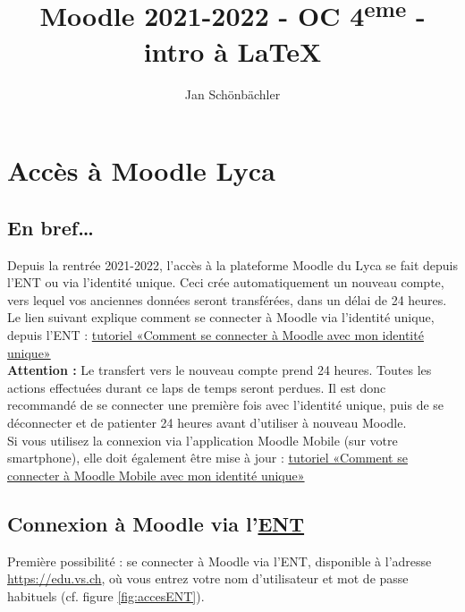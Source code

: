 \documentclass[10pt,a4paper]{report}
\author{Jan Schönbächler}
\title{Moodle 2021-2022 - OC 4\textsuperscript{eme} - intro à \LaTeX}
\begin{document}
	
	
	\parindent=0cm
	
	\chapter{Accès à Moodle Lyca}
	
	\section*{En bref\dots}
	
	Depuis la rentrée 2021-2022, l'accès à la plateforme Moodle du Lyca se fait depuis l'ENT ou via l'identité unique. Ceci crée automatiquement un nouveau compte, vers lequel vos anciennes données seront transférées, dans un délai de 24 heures.\\
	
	
	Le lien suivant explique comment se connecter à Moodle via l'identité unique, depuis l'ENT : \href{https://support.ictvs.ch/media/attachments/2021/07/20/tutoriel\_moodle\_win-fr\_2-acces-identite-unique.pdf}{tutoriel «Comment se connecter à Moodle avec mon identité unique»}\\
	
	
	\textbf{Attention :} Le transfert vers le nouveau compte prend 24 heures. Toutes les actions effectuées durant ce laps de temps seront perdues. Il est donc recommandé de se connecter une première fois avec l'identité unique, puis de se déconnecter et de patienter 24 heures avant d’utiliser à nouveau Moodle.\\
	
	Si vous utilisez la connexion via l’application Moodle Mobile (sur votre smartphone), elle doit également être mise à jour : \href{https://support.ictvs.ch/media/attachments/2021/07/22/tutoriel\_moodle\_android-fr\_2-acces-identite-unique-mobile.pdf}{tutoriel «Comment se connecter à Moodle Mobile avec mon identité unique»}
	
	
	\section{Connexion à Moodle via l'\href{https://edu.vs.ch}{ENT}}
	
	
	Première possibilité : se connecter à Moodle via l'ENT, disponible à l'adresse \href{https://edu.vs.ch}{https://edu.vs.ch}, où vous entrez votre nom d'utilisateur et mot de passe habituels (cf. figure \ref{fig:accesENT}).
	
\end{document}
